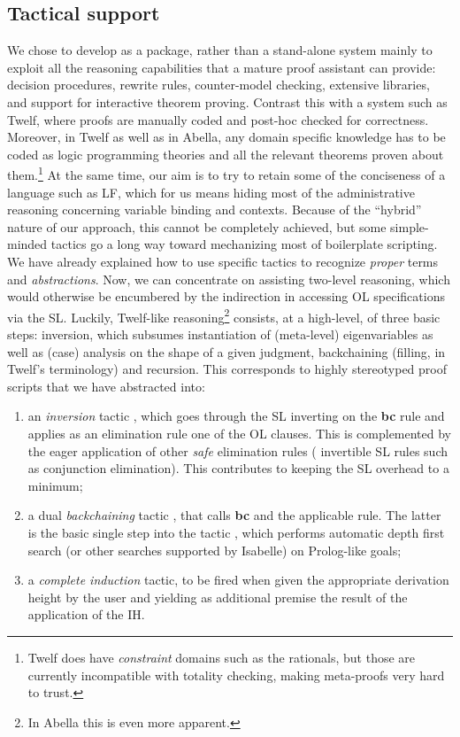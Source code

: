 \documentclass[final]{svjour3}
\begin{document}
\subsection{Tactical support}
\label{ssec:tac}
We chose to develop \hybrid as a package, rather than a stand-alone
system mainly to exploit all the reasoning capabilities that a mature
proof assistant can provide: decision procedures, rewrite rules,
counter-model checking, extensive libraries, and support for
interactive theorem proving.  Contrast this with a system such as
Twelf, where proofs are manually coded and post-hoc checked for
correctness. Moreover, in Twelf as well as in Abella, any domain
specific knowledge has to be coded as logic programming theories and
all the relevant theorems proven about them.\footnote{Twelf does have
  \emph{constraint} domains such as the rationals, but those are
  currently incompatible with totality checking, making meta-proofs
  very hard to trust.}  At the same time, our aim is to try to retain
some of the conciseness of a language such as LF, which for us means
hiding most of the administrative reasoning concerning variable
binding and contexts.  Because of the ``hybrid'' nature of our
approach, this cannot be completely achieved, but some simple-minded
tactics go a long way toward mechanizing most of boilerplate
scripting.  We have already explained how to use specific tactics to
recognize \emph{proper} terms and \emph{abstractions}. Now, we can
concentrate on assisting two-level reasoning, which would otherwise be
encumbered by the indirection in accessing OL specifications via the
SL\@.  Luckily, Twelf-like reasoning\footnote{In Abella this is even
  more apparent.} consists, at a high-level, of three basic steps:
inversion, which subsumes instantiation of (meta-level) eigenvariables
as well as (case) analysis on the shape of a given judgment,
backchaining (filling, in Twelf's terminology) and recursion. This
corresponds to highly stereotyped proof scripts that we have
abstracted into:
\begin{enumerate}
\item an \emph{inversion} tactic , which goes
  through the SL inverting on the \textbf{bc} rule and applies as an
  elimination rule one of the OL clauses.  This is complemented by the
  eager application of other \emph{safe} elimination rules (\viz
  invertible SL rules such as conjunction elimination). This
  contributes to keeping the SL overhead to a minimum;
\item a dual \emph{backchaining} tactic , that calls
  \textbf{bc} and the applicable  rule. The latter is the
  basic single step into the tactic , which
  performs automatic depth first search (or other searches supported
  by Isabelle) on Prolog-like goals;
\item a \emph{complete induction} tactic, to be fired when given the
  appropriate derivation height by the user and yielding as additional
  premise the result of the application of the IH.
\end{enumerate}
\end{document}
